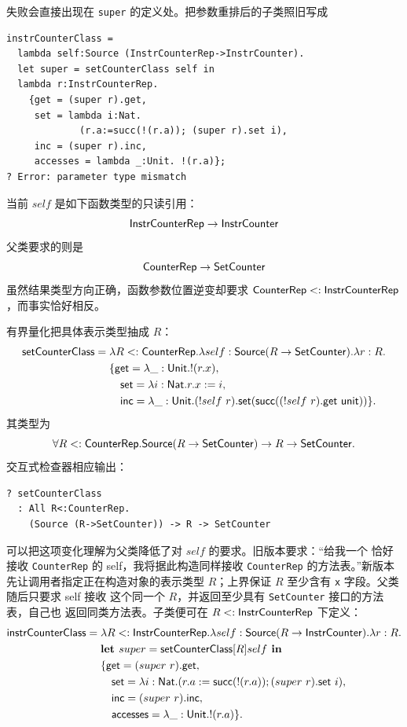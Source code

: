 失败会直接出现在 \texttt{super} 的定义处。把参数重排后的子类照旧写成
\begin{lstlisting}
instrCounterClass =
  lambda self:Source (InstrCounterRep->InstrCounter).
  let super = setCounterClass self in
  lambda r:InstrCounterRep.
    {get = (super r).get,
     set = lambda i:Nat.
             (r.a:=succ(!(r.a)); (super r).set i),
     inc = (super r).inc,
     accesses = lambda _:Unit. !(r.a)};
? Error: parameter type mismatch
\end{lstlisting}
当前 \(self\) 是如下函数类型的只读引用：
\[
\mathsf{InstrCounterRep}\to\mathsf{InstrCounter}
\]
父类要求的则是
\[
\mathsf{CounterRep}\to\mathsf{SetCounter}
\]
虽然结果类型方向正确，函数参数位置逆变却要求
\(\mathsf{CounterRep}<:\mathsf{InstrCounterRep}\)，而事实恰好相反。

有界量化把具体表示类型抽成 \(R\)：
\[
\begin{aligned}
\mathsf{setCounterClass}
={}&\lambda R<:\mathsf{CounterRep}.
\lambda self:\mathsf{Source}(R\to\mathsf{SetCounter}).
\lambda r:R.\\
&\{\mathsf{get}=\lambda\_:\mathsf{Unit}.!(r.x),\\
&\quad\mathsf{set}=\lambda i:\mathsf{Nat}.r.x:=i,\\
&\quad\mathsf{inc}=\lambda\_:\mathsf{Unit}.
(!self\ r).\mathsf{set}
(\mathsf{succ}((!self\ r).\mathsf{get}\ \mathsf{unit}))\}.
\end{aligned}
\]
其类型为
\[
\forall R<:\mathsf{CounterRep}.
\mathsf{Source}(R\to\mathsf{SetCounter})
\to R\to\mathsf{SetCounter}.
\]
交互式检查器相应输出：
\begin{lstlisting}
? setCounterClass
  : All R<:CounterRep.
    (Source (R->SetCounter)) -> R -> SetCounter
\end{lstlisting}
可以把这项变化理解为父类降低了对 \(self\) 的要求。旧版本要求：“给我一个
恰好接收 \texttt{CounterRep} 的 self，我将据此构造同样接收
\texttt{CounterRep} 的方法表。”新版本先让调用者指定正在构造对象的表示类型
\(R\)；上界保证 \(R\) 至少含有 \texttt{x} 字段。父类随后只要求 self 接收
这个同一个 \(R\)，并返回至少具有 \texttt{SetCounter} 接口的方法表，自己也
返回同类方法表。子类便可在
\(R<:\mathsf{InstrCounterRep}\) 下定义：
\[
\begin{aligned}
\mathsf{instrCounterClass}
={}&\lambda R<:\mathsf{InstrCounterRep}.
\lambda self:\mathsf{Source}(R\to\mathsf{InstrCounter}).
\lambda r:R.\\
&\textbf{let }super=\mathsf{setCounterClass}[R]self\textbf{ in}\\
&\{\mathsf{get}=(super\ r).\mathsf{get},\\
&\quad\mathsf{set}=\lambda i:\mathsf{Nat}.
(r.a:=\mathsf{succ}(!(r.a));(super\ r).\mathsf{set}\ i),\\
&\quad\mathsf{inc}=(super\ r).\mathsf{inc},\\
&\quad\mathsf{accesses}=\lambda\_:\mathsf{Unit}.!(r.a)\}.
\end{aligned}
\]
